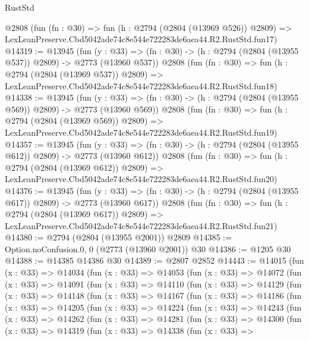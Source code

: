 \begin{lexlean}{RustStd}
\begin{coremodule}
    @2808
    (fun (fn : @30) =>
    fun (h : @2794 (@2804 (@13969 @526)) @2809) =>
    LexLeanPreserve.Cbd5042ade74c8e544e722283de6aea44.R2.RustStd.fun17)
@14319 := @13945
    (fun (y : @33) => (fn : @30) -> (h : @2794 (@2804 (@13955 @537)) @2809) -> @2773 (@13960 @537))
    @2808
    (fun (fn : @30) =>
    fun (h : @2794 (@2804 (@13969 @537)) @2809) =>
    LexLeanPreserve.Cbd5042ade74c8e544e722283de6aea44.R2.RustStd.fun18)
@14338 := @13945
    (fun (y : @33) => (fn : @30) -> (h : @2794 (@2804 (@13955 @569)) @2809) -> @2773 (@13960 @569))
    @2808
    (fun (fn : @30) =>
    fun (h : @2794 (@2804 (@13969 @569)) @2809) =>
    LexLeanPreserve.Cbd5042ade74c8e544e722283de6aea44.R2.RustStd.fun19)
@14357 := @13945
    (fun (y : @33) => (fn : @30) -> (h : @2794 (@2804 (@13955 @612)) @2809) -> @2773 (@13960 @612))
    @2808
    (fun (fn : @30) =>
    fun (h : @2794 (@2804 (@13969 @612)) @2809) =>
    LexLeanPreserve.Cbd5042ade74c8e544e722283de6aea44.R2.RustStd.fun20)
@14376 := @13945
    (fun (y : @33) => (fn : @30) -> (h : @2794 (@2804 (@13955 @617)) @2809) -> @2773 (@13960 @617))
    @2808
    (fun (fn : @30) =>
    fun (h : @2794 (@2804 (@13969 @617)) @2809) =>
    LexLeanPreserve.Cbd5042ade74c8e544e722283de6aea44.R2.RustStd.fun21)
@14380 := @2794 (@2804 (@13955 @2001)) @2809
@14385 := Option.noConfusion.{0, 0} (@2773 (@13960 @2001)) @30
@14386 := @1205 @30
@14388 := @14385 @14386 @30
@14389 := @2807 @2852
@14443 := @14015
    (fun (x : @33) =>
    @14034
      (fun (x : @33) =>
      @14053
        (fun (x : @33) =>
        @14072
          (fun (x : @33) =>
          @14091
            (fun (x : @33) =>
            @14110
              (fun (x : @33) =>
              @14129
                (fun (x : @33) =>
                @14148
                  (fun (x : @33) =>
                  @14167
                    (fun (x : @33) =>
                    @14186
                      (fun (x : @33) =>
                      @14205
                        (fun (x : @33) =>
                        @14224
                          (fun (x : @33) =>
                          @14243
                            (fun (x : @33) =>
                            @14262
                              (fun (x : @33) =>
                              @14281
                                (fun (x : @33) =>
                                @14300
                                  (fun (x : @33) =>
                                  @14319
                                    (fun (x : @33) =>
                                    @14338
                                      (fun (x : @33) =>

\end{coremodule}
\end{lexlean}
